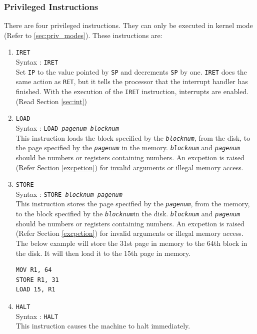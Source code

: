 \documentclass[11pt]{report}
\begin{document}
\subsubsection{Privileged Instructions}
There are four privileged instructions. They can only be executed in kernel mode (Refer to \ref{sec:priv_modes}).  These instructions are:
\begin{enumerate}

\item \texttt{IRET}\\
Syntax : \texttt{IRET}\\

Set \texttt{IP} to the value pointed by \texttt{SP} and decrements \texttt{SP} by one. \texttt{IRET} does the same action as \texttt{RET}, but it tells the processor that the interrupt handler has finished. With the execution of the \texttt{IRET} instruction, interrupts are enabled. (Read Section \ref{sec:int})

\item \texttt{LOAD}\\
Syntax : \texttt{LOAD \textit{pagenum} \textit{blocknum}}\\
This instruction loads the block specified by the \texttt{\textit{blocknum}}, from the disk, to the page specified by the \texttt{\textit{pagenum}} in the memory. \texttt{\textit{blocknum}} and \texttt{\textit{pagenum}} should be numbers or registers containing numbers. An excpetion is raised (Refer Section \ref{excpetion}) for invalid arguments or illegal memory access.

\item \texttt{STORE}\\
Syntax : \texttt{STORE \textit{blocknum} \textit{pagenum} }\\ 
This instruction stores the page specified by the \texttt{\textit{pagenum}}, from the memory, to the block specified by the \texttt{\textit{blocknum}}in the disk. \texttt{\textit{blocknum}} and \texttt{\textit{pagenum}} should be numbers or registers containing numbers. An excpetion is raised (Refer Section \ref{excpetion}) for invalid arguments or illegal memory access.\\

The below example will store the 31st page in memory to the 64th block in the disk. It will then load it to the 15th page in memory.
\begin{verbatim}
MOV R1, 64
STORE R1, 31
LOAD 15, R1	
\end{verbatim}	

\item \texttt{HALT}\\
Syntax : \texttt{HALT}\\
This instruction causes the machine to halt immediately. 
\end{enumerate}
\end{document}
